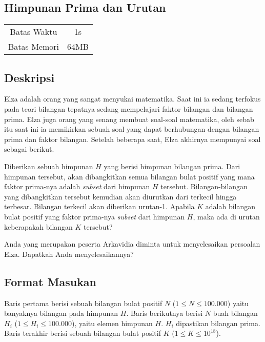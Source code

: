 \documentclass{article}
\begin{document}
\begin{center}
    \section*{Himpunan Prima dan Urutan} %

    \begin{tabular}{ | c c | }
        \hline
        Batas Waktu  & 1s \\    %
        Batas Memori & 64MB \\  %
        \hline
    \end{tabular}
\end{center}

\subsection*{Deskripsi}

Elza adalah orang yang sangat menyukai matematika. Saat ini ia sedang terfokus pada teori bilangan tepatnya 
sedang mempelajari faktor bilangan dan bilangan prima. Elza juga orang yang senang membuat soal-soal matematika, 
oleh sebab itu saat ini ia memikirkan sebuah soal yang dapat berhubungan dengan bilangan prima dan faktor bilangan. 
Setelah beberapa saat, Elza akhirnya mempunyai soal sebagai berikut.

Diberikan sebuah himpunan $H$ yang berisi himpunan bilangan prima. Dari himpunan tersebut, akan dibangkitkan 
semua bilangan bulat positif yang mana faktor prima-nya adalah \textit{subset} dari himpunan $H$ tersebut. 
Bilangan-bilangan yang dibangkitkan tersebut kemudian akan diurutkan dari terkecil hingga terbesar. Bilangan 
terkecil akan diberikan urutan-1. Apabila $K$ adalah bilangan bulat positif yang faktor prima-nya \textit{subset}
dari himpunan $H$, maka ada di urutan keberapakah bilangan $K$ tersebut?

Anda yang merupakan peserta Arkavidia diminta untuk menyelesaikan persoalan Elza. Dapatkah Anda menyelesaikannya?

\subsection*{Format Masukan}
Baris pertama berisi sebuah bilangan bulat positif $N$ ($1 \leq N \leq 100.000$) yaitu banyaknya bilangan pada
himpunan $H$. Baris berikutnya berisi $N$ buah bilangan $H_i$ ($1 \leq H_i \leq 100.000$), yaitu elemen himpunan $H$. $H_i$ dipastikan
bilangan prima. Baris terakhir berisi sebuah bilangan bulat positif $K$ ($1 \leq K \leq 10^{18}$).
\end{document}

